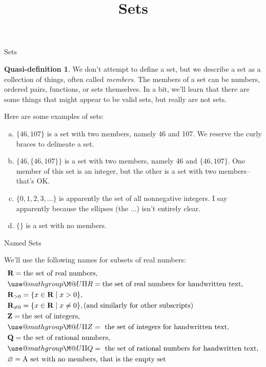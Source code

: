 \documentclass[fleqn]{beamer}
\title{\textbf{Sets}}
\date{}
\makeatletter
\newcommand{\reals}{\mathbf{R}}
\newcommand{\integers}{\mathbf{Z}}
\theoremstyle{definition}
\newtheorem{myqdef}{Quasi-definition}
\newenvironment{alphalist}{
  \begin{enumerate}[(a)]
    \addtolength{\itemsep}{1.0\itemsep}}
  {\end{enumerate}}
\def\amsbb{\use@mathgroup \M@U \symAMSb}
\makeatother
\begin{document}
\frame{\titlepage}

\begin{frame}{Sets}
\begin{myqdef} We don't attempt to define a set, but we describe a set as a collection of things, often called \emph{members}.   
The  members of a set can be numbers, ordered pairs,  functions, or sets themselves. In a bit, we'll learn that there are some things that might appear to be valid sets, but really are not sets. 
\end{myqdef}

\end{frame}

\begin{frame}
Here are some examples of sets:
\begin{alphalist}

\item  $\{46, 107\}$ is a set with two members, namely 46 and 107. We reserve the curly braces to delineate a set.

\item  $\{46, \{46, 107 \} \}$ is a set with two members, namely 46 and  \(\{46, 107 \}\).  One member of this set is an integer, but the other is a set with two members--that's OK.

\item $\{0,1,2,3, \dots \}$ is apparently the set of all nonnegative integers.  I say apparently because the ellipses (the $\dots$) isn't entirely clear.

\item $\{ \}$ is a set with no members. 
\end{alphalist}
\end{frame}
\begin{frame}{Named Sets}

We'll use the following names for subsets of real numbers:
\begin{align*}
&\reals = \mbox{the set of real numbers}, \\
& \amsbb{R} =  \mbox{the set of real numbers for handwritten text}, \\
&\reals_{> 0} = \{x \in \reals  \mid  x > 0\}, \\
&\reals_{\neq 0}  =  \{x \in \reals  \mid   x \neq 0\},  \mbox{(and similarly for other subscripts)} \\
&\integers = \mbox{the set of integers}, \\
& \amsbb{Z} = \mbox{ the set of integers for handwritten text}, \\
&\mathbf{Q} = \mbox{the set of rational numbers}, \\
& \amsbb{Q} = \mbox{ the set of rational numbers for handwritten text}, \\
&\varnothing = \mbox{A set with no members, that is the empty set}
\end{align*}

\end{frame}
\end{document}

